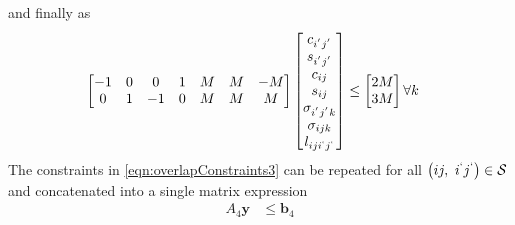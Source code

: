 	and finally as
	\begin{equation}\begin{aligned} 
		\begin{bmatrix} 
			-1 & 0 &  0 & 1 & M & M & -M \\
			 0 & 1 & -1 & 0 & M & M &  M \\
		\end{bmatrix} 
		\begin{bmatrix}
			c_{i^{'}j^{'}}       \\ 
			s_{i^{'}j^{'}}       \\
			c_{ij}               \\
			s_{ij}               \\ 
			\sigma_{i^{'}j^{'}k} \\ 
			\sigma_{ijk}         \\
			l_{iji^{`}j^{`}}     \\
		\end{bmatrix} &\le 
		\begin{bmatrix} 
			2M \\ 
			3M \\
		\end{bmatrix} \forall k
	\end{aligned} \end{equation}
	The constraints in \eqref{eqn:overlapConstraints3} can be repeated for all $\left ( ij, \ i^{`}j^{`} \right ) \in \mathcal{S}$ and concatenated into a single matrix expression
	\begin{equation}\begin{aligned} 
		A_4\mathbf{y} & \le \mathbf{b}_4 \\
	\end{aligned} \end{equation} 
